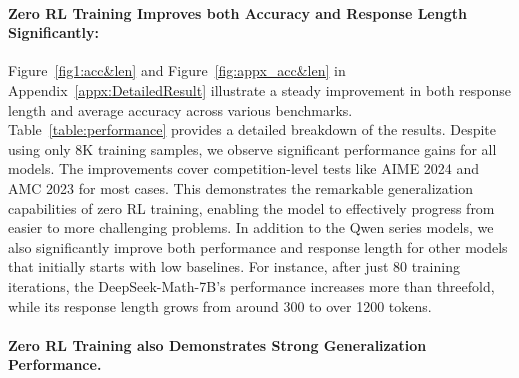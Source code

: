\paragraph{Zero RL Training Improves both Accuracy and Response Length Significantly:}
Figure~\ref{fig1:acc&len} and Figure~\ref{fig:appx_acc&len} in Appendix~\ref{appx:DetailedResult} illustrate a steady improvement in both response length and average accuracy across various benchmarks.  Table~\ref{table:performance} provides a detailed breakdown of the results. Despite using only 8K training samples, we observe significant performance gains for all models. The improvements cover competition-level tests like AIME 2024 and AMC 2023 for most cases. This demonstrates the remarkable generalization capabilities of zero RL training, enabling the model to effectively progress from easier to more challenging problems.
\label{sec:mistral_fail}
In addition to the Qwen series models, we also significantly improve both performance and response length for other models that initially starts with low baselines. For instance, after just 80 training iterations, the DeepSeek-Math-7B's performance increases more than threefold, while its response length grows from around 300 to over 1200 tokens. 

\paragraph{Zero RL Training also Demonstrates Strong Generalization Performance.}

